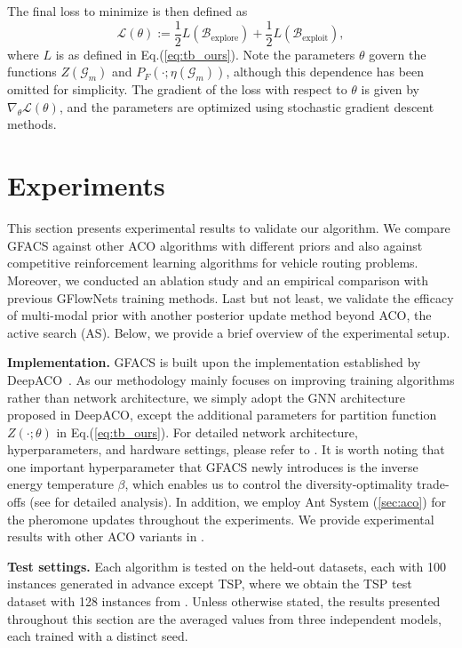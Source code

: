 \documentclass[twoside]{article}
\theoremstyle{plain}
\theoremstyle{definition}
\theoremstyle{remark}
\begin{document}
The final loss to minimize is then defined as
\begin{equation}
    \mathcal{L}(\theta):= \frac{1}{2}L( \mathcal{B}_{\text{explore}}) + \frac{1}{2}L(\mathcal{B}_{\text{exploit}}), 
\end{equation}
where $L$ is as defined in Eq.(\ref{eq:tb_ours}). Note the parameters $\theta$ govern the functions $Z(\mathcal{G}_m)$ and $P_F(\cdot; \eta(\mathcal{G}_m))$, although this dependence has been omitted for simplicity. The gradient of the loss with respect to $\theta$ is given by $\nabla_{\theta}\mathcal{L}(\theta)$, and the parameters are optimized using stochastic gradient descent methods.




\section{Experiments}

This section presents experimental results to validate our algorithm. We compare GFACS against other ACO algorithms with different priors and also against competitive reinforcement learning algorithms for vehicle routing problems. Moreover, we conducted an ablation study and an empirical comparison with previous GFlowNets training methods. Last but not least, we validate the efficacy of multi-modal prior with another posterior update method beyond ACO, the active search (AS). Below, we provide a brief overview of the experimental setup.

\textbf{Implementation.} GFACS is built upon the implementation established by DeepACO~\citep{ye2023deepaco}. As our methodology mainly focuses on improving training algorithms rather than network architecture, we simply adopt the GNN architecture proposed in DeepACO, except the additional parameters for partition function $Z(\cdot;\theta)$ in Eq.(\ref{eq:tb_ours}). For detailed network architecture, hyperparameters, and hardware settings, please refer to . It is worth noting that one important hyperparameter that GFACS newly introduces is the inverse energy temperature $\beta$, which enables us to control the diversity-optimality trade-offs (see  for detailed analysis). In addition, we employ Ant System (\cref{sec:aco}) for the pheromone updates throughout the experiments. We provide experimental results with other ACO variants in .

\textbf{Test settings.} Each algorithm is tested on the held-out datasets, each with 100 instances generated in advance except TSP, where we obtain the TSP test dataset with 128 instances from \citet{ye2023deepaco}. Unless otherwise stated, the results presented throughout this section are the averaged values from three independent models, each trained with a distinct seed.
\end{document}
